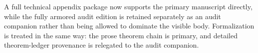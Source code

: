 A full technical appendix package now supports the primary manuscript directly, while the fully armored audit edition is retained separately as an audit companion rather than being allowed to dominate the visible body. Formalization is treated in the same way: the prose theorem chain is primary, and detailed theorem-ledger provenance is relegated to the audit companion.